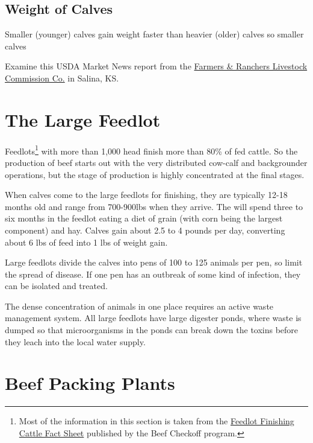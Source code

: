 \documentclass[
]{book}
\begin{document}
\hypertarget{weight-of-calves}{%
\subsection{Weight of Calves}\label{weight-of-calves}}

Smaller (younger) calves gain weight faster than heavier (older) calves so smaller calves

Examine this USDA Market News report from the \href{http://www.ams.usda.gov/mnreports/dc_ls143.txt}{Farmers \& Ranchers Livestock Commission Co.} in Salina, KS.

\hypertarget{the-large-feedlot}{%
\section{The Large Feedlot}\label{the-large-feedlot}}

Feedlots\footnote{Most of the information in this section is taken from the \href{http://www.beefusa.org/uDocs/Feedlot\%20finishing\%20fact\%20sheet\%20FINAL_4\%2026\%2006.pdf}{Feedlot Finishing Cattle Fact Sheet} published by the Beef Checkoff program.} with more than 1,000 head finish more than 80\% of fed cattle. So the production of beef starts out with the very distributed cow-calf and backgrounder operations, but the stage of production is highly concentrated at the final stages.

When calves come to the large feedlots for finishing, they are typically 12-18 months old and range from 700-900lbs when they arrive. The will spend three to six months in the feedlot eating a diet of grain (with corn being the largest component) and hay. Calves gain about 2.5 to 4 pounds per day, converting about 6 lbs of feed into 1 lbs of weight gain.

Large feedlots divide the calves into pens of 100 to 125 animals per pen, so limit the spread of disease. If one pen has an outbreak of some kind of infection, they can be isolated and treated.

The dense concentration of animals in one place requires an active waste management system. All large feedlots have large digester ponds, where waste is dumped so that microorganisms in the ponds can break down the toxins before they leach into the local water supply.

\hypertarget{beef-packing-plants}{%
\section{Beef Packing Plants}\label{beef-packing-plants}}
\end{document}
